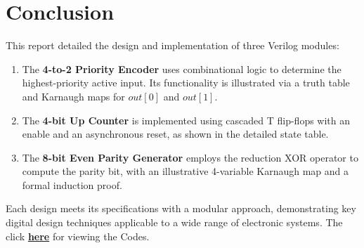 \documentclass[11pt]{article}
\begin{document}
\section{Conclusion}
This report detailed the design and implementation of three Verilog modules:
\begin{enumerate}
    \item The \textbf{4-to-2 Priority Encoder} uses combinational logic to determine the highest-priority active input. Its functionality is illustrated via a truth table and Karnaugh maps for \({out[0]}\) and \({out[1]}\).
    \item The \textbf{4-bit Up Counter} is implemented using cascaded T flip-flops with an enable and an asynchronous reset, as shown in the detailed state table.
    \item The \textbf{8-bit Even Parity Generator} employs the reduction XOR operator to compute the parity bit, with an illustrative 4-variable Karnaugh map and a formal induction proof.
\end{enumerate}
Each design meets its specifications with a modular approach, demonstrating key digital design techniques applicable to a wide range of electronic systems.
The click \href{https://github.com/AbhimanyuKoushik/Academics/tree/main/Digital\%20Systems\%20Lab/Assignment1}{\textbf{here}} for viewing the Codes.
\end{document}
